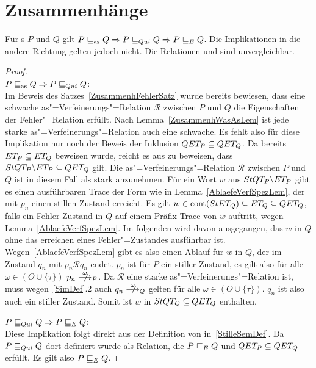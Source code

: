 \section{Zusammenhänge}

\begin{Satz}
  \label{ZusammenhStilleSatz}
  Für \MEIO{}s $P$ und $Q$ gilt $P \sqsubseteq _{\mathrm{as}} Q \Rightarrow P  \sqsubseteq  _{Qui} Q \Rightarrow
  P  \sqsubseteq  _E Q$. Die Implikationen in die andere Richtung gelten jedoch nicht. Die
  Relationen \wasRel{} und \QRel{} sind unvergleichbar.
\end{Satz}
\begin{proof}\mbox{}\\
  $P \sqsubseteq _{\mathrm{as}} Q \Rightarrow P  \sqsubseteq  _{Qui} Q$:\\
  Im Beweis des Satzes~\ref{ZusammenhFehlerSatz} wurde bereits bewiesen, dass
  eine schwache as"=Verfeinerungs"=Relation $\mathcal{R}$ zwischen $P$ und $Q$
  die Eigenschaften der Fehler"=Relation \ERel{} erfüllt. Nach
  Lemma~\ref{ZusammenhWasAsLem} ist jede starke as"=Verfeinerungs"=Relation
  auch eine schwache. Es fehlt also für diese Implikation nur noch der Beweis
  der Inklusion $QET _P \subseteq QET _Q$. Da bereits $ET _P\subseteq ET
  _Q$ beweisen wurde, reicht es aus zu beweisen, dass $StQT _P \backslash ET
  _P\subseteq QET _Q$ gilt. Die as"=Verfeinerungs"=Relation $\mathcal{R}$
  zwischen $P$ und $Q$ ist in diesem Fall als stark anzunehmen. Für ein Wort
  $w$ aus $StQT _P \backslash ET _P$ gibt es einen ausführbaren Trace der
  Form wie in Lemma~\ref{AblaefeVerfSpezLem}, der mit $p_n$ einen stillen
  Zustand erreicht. Es gilt $w\in\mathrm{cont} (StET _Q) \subseteq ET _Q\subseteq QET
  _Q$, falls ein Fehler-Zustand in $Q$ auf einem Präfix-Trace von $w$ auftritt,
  wegen Lemma~\ref{AblaefeVerfSpezLem}. Im folgenden wird davon ausgegangen,
  das $w$ in $Q$ ohne das erreichen eines Fehler"=Zustandes ausführbar ist.
  Wegen~\ref{AblaefeVerfSpezLem} gibt es also einen Ablauf für $w$ in $Q$, der
  im Zustand $q_n$ mit $p_n \mathcal{R} q_n$ endet. $p_n$ ist für $P$ ein
  stiller Zustand, es gilt also für alle $\omega \in (O\cup \{\tau\})$ $p_n
  \nmust[\omega]_P$. Da $\mathcal{R}$ eine starke as"=Verfeinerungs"=Relation
  ist, muss wegen~\ref{SimDef}.2 auch $q_n \nmust[\omega]_Q$ gelten für alle
  $\omega \in (O\cup \{\tau\})$. $q_n$ ist also auch ein stiller Zustand. Somit
  ist $w$ in $StQT _Q\subseteq QET _Q$ enthalten.

  $P  \sqsubseteq  _{Qui} Q \Rightarrow P  \sqsubseteq  _E Q$:\\
  Diese Implikation folgt direkt aus der Definition von \QRel{}
  in~\ref{StilleSemDef}. Da $P  \sqsubseteq  _{Qui} Q$ dort definiert wurde als Relation, die
  $P  \sqsubseteq  _E Q$ und $QET _P \subseteq QET _Q$ erfüllt. Es gilt also $P  \sqsubseteq  _E Q$.


\end{proof}
